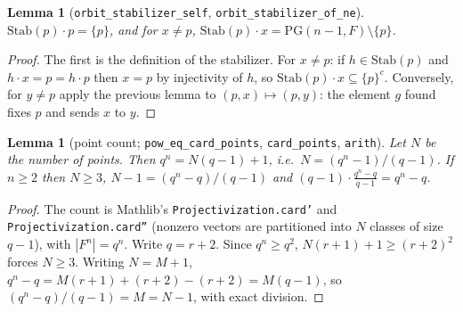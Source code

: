 \documentclass[11pt]{article}
\newtheorem{lemma}[theorem]{Lemma}
\theoremstyle{definition}
\newcommand{\PG}{\mathrm{PG}}
\newcommand{\Stab}{\mathrm{Stab}}
\begin{document}
\begin{lemma}[\texttt{orbit\_stabilizer\_self}, \texttt{orbit\_stabilizer\_of\_ne}]
$\Stab(p)\cdot p=\{p\}$, and for $x\ne p$, $\Stab(p)\cdot x=\PG(n-1,F)\setminus\{p\}$.
\end{lemma}
\begin{proof}
The first is the definition of the stabilizer. For $x\ne p$: if $h\in\Stab(p)$ and $h\cdot x=p=h\cdot p$
then $x=p$ by injectivity of $h$, so $\Stab(p)\cdot x\subseteq\{p\}^c$. Conversely, for $y\ne p$
apply the previous lemma to $(p,x)\mapsto(p,y)$: the element $g$ found fixes $p$ and sends $x$ to $y$.
\end{proof}

\begin{lemma}[point count; \texttt{pow\_eq\_card\_points}, \texttt{card\_points}, \texttt{arith}]
Let $N$ be the number of points. Then $q^n=N(q-1)+1$, i.e.\ $N=(q^n-1)/(q-1)$. If $n\ge 2$ then
$N\ge 3$, $N-1=(q^n-q)/(q-1)$ and $(q-1)\cdot\frac{q^n-q}{q-1}=q^n-q$.
\end{lemma}
\begin{proof}
The count is Mathlib's \texttt{Projectivization.card'} and \texttt{Projectivization.card''}
(nonzero vectors are partitioned into $N$ classes of size $q-1$), with $|F^n|=q^n$.
Write $q=r+2$. Since $q^n\ge q^2$, $N(r+1)+1\ge (r+2)^2$ forces $N\ge 3$. Writing $N=M+1$,
$q^n-q=M(r+1)+(r+2)-(r+2)=M(q-1)$, so $(q^n-q)/(q-1)=M=N-1$, with exact division.
\end{proof}
\end{document}
